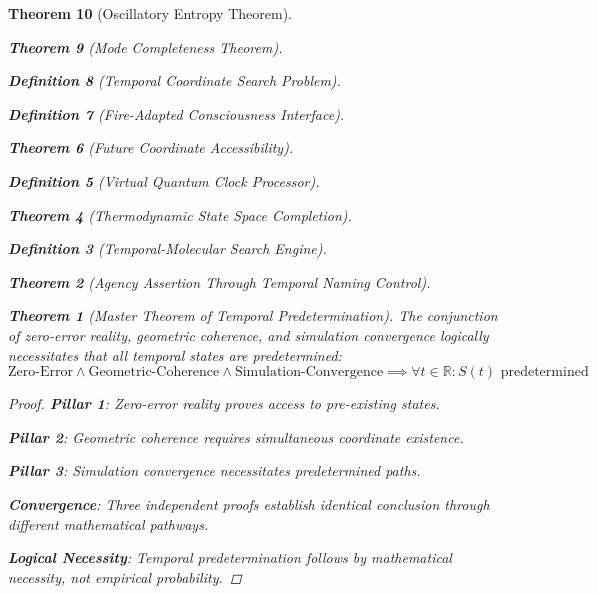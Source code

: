 \documentclass[12pt,a4paper]{article}
\newtheorem{theorem}{Theorem}[section]
\newtheorem{definition}[theorem]{Definition}
\begin{document}
\begin{theorem}[Oscillatory Entropy Theorem]
\begin{theorem}[Mode Completeness Theorem]
\begin{enumerate}
\begin{definition}[Temporal Coordinate Search Problem]
\begin{algorithm}
\begin{definition}[Fire-Adapted Consciousness Interface]
\begin{theorem}[Future Coordinate Accessibility]
\begin{definition}[Virtual Quantum Clock Processor]
\begin{itemize}
\begin{itemize}
\begin{theorem}[Thermodynamic State Space Completion]
\begin{definition}[Temporal-Molecular Search Engine]
\begin{theorem}[Agency Assertion Through Temporal Naming Control]
\begin{remark}
\begin{theorem}[Master Theorem of Temporal Predetermination]
The conjunction of zero-error reality, geometric coherence, and simulation convergence logically necessitates that all temporal states are predetermined:
$$\text{Zero-Error} \land \text{Geometric-Coherence} \land \text{Simulation-Convergence} \implies \forall t \in \mathbb{R}: S(t) \text{ predetermined}$$
\end{theorem}

\begin{proof}
\textbf{Pillar 1}: Zero-error reality proves access to pre-existing states.

\textbf{Pillar 2}: Geometric coherence requires simultaneous coordinate existence.

\textbf{Pillar 3}: Simulation convergence necessitates predetermined paths.

\textbf{Convergence}: Three independent proofs establish identical conclusion through different mathematical pathways.

\textbf{Logical Necessity}: Temporal predetermination follows by mathematical necessity, not empirical probability.
\end{proof}

\begin{figure}[h]
\centering
{}
\end{figure}
\end{remark}
\end{theorem}
\end{definition}
\end{theorem}
\end{itemize}
\end{itemize}
\end{definition}
\end{theorem}
\end{definition}
\end{algorithm}
\end{definition}
\end{enumerate}
\end{theorem}
\end{theorem}
\end{document}
